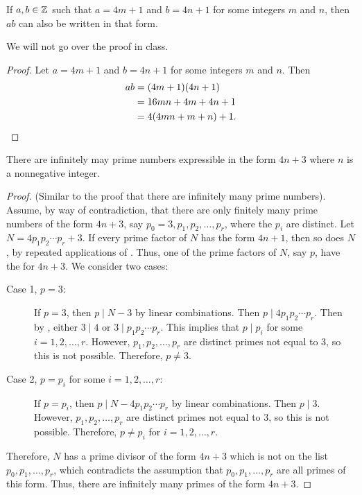 \documentclass[letterpaper, 11 pt]{ximera}
\begin{document}
\begin{lem*}[Lemma 1.23]\label{lem:prod-goodprimes}
 If $a,b\in\mathbb Z$ such that $a=4m+1$ and $b=4n+1$ for some integers $m$ and $n$, then $ab$ can also be written in that form.
\end{lem*}
We will not go over the proof in class.
\begin{proof}
 Let $a=4m+1$ and $b=4n+1$ for some integers $m$ and $n$. Then 
\begin{align*}
ab&=(4m+1)(4n+1)\\
&=16mn+4m+4n+1\\
&=4(4mn+m+n)+1.\qedhere
\end{align*}
\end{proof}

\begin{prop*}[Proposition 1.22]\label{prop:inf-badprimes}
 There are infinitely may prime numbers expressible in the form $4n+3$ where $n$ is a nonnegative integer.
\end{prop*}
\begin{proof}
 (Similar to the proof that there are infinitely many prime numbers). Assume, by way of contradiction, that there are only finitely many prime numbers of the form $4n+3$, say $p_0=3, p_1,p_2,\dots, p_r$, where the $p_i$ are distinct. Let $N=4p_1 p_2 \cdots p_r+3$. If every prime factor of $N$ has the form $4n+1$, then so does $N$, by repeated applications of . Thus, one of the prime factors of $N$, say $p$, have the for $4n+3$. We consider two cases:
 
\begin{description}
 \item[Case 1, $p=3$:] If $p=3$, then $p\mid N-3$ by linear combinations. Then $p\mid 4 p_1p_2\cdots p_r$. Then by , either $3\mid 4$ or $3\mid p_1p_2\cdots p_r$. This implies that $p\mid p_i$ for some $i=1,2,\dots,r$. However, $p_1,p_2,\dots,p_r$ are distinct primes not equal to $3$, so this is not possible. Therefore, $p\neq 3$.
 
 \item[Case 2, $p=p_i$ for some $i=1,2,\dots, r$:] If $p=p_i$, then $p\mid N-4p_1p_2\cdots p_r$ by linear combinations. Then $p\mid 3$. However, $p_1,p_2,\dots,p_r$ are distinct primes not equal to $3$, so this is not possible. Therefore, $p\neq p_i$ for $i=1,2,\dots,r$.
\end{description}
Therefore, $N$ has a prime divisor of the form $4n+3$ which is not on the list $p_0,p_1,\dots,p_r$, which contradicts the assumption that $p_0,p_1,\dots,p_r$ are all primes of this form. Thus, there are infinitely many primes of the form $4n+3$.
\end{proof}
\end{document}
